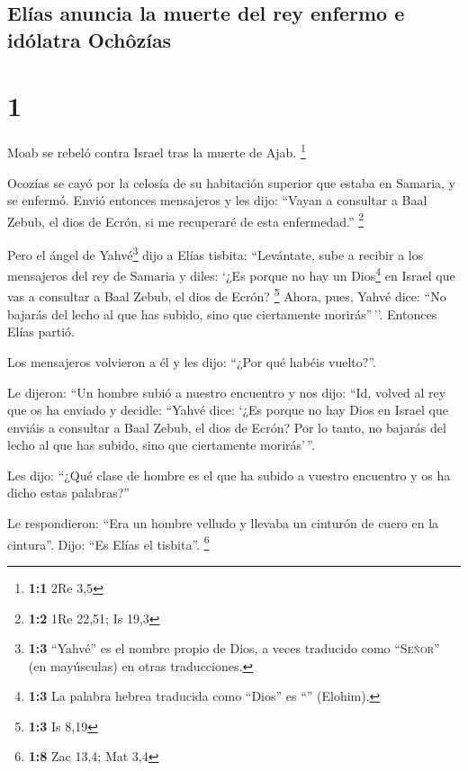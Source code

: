 \hypertarget{eluxedas-anuncia-la-muerte-del-rey-enfermo-e-iduxf3latra-ochuxf4zuxedas}{%
\subsection{Elías anuncia la muerte del rey enfermo e idólatra
Ochôzías}\label{eluxedas-anuncia-la-muerte-del-rey-enfermo-e-iduxf3latra-ochuxf4zuxedas}}

\hypertarget{section}{%
\section{1}\label{section}}

 Moab se rebeló contra Israel tras la muerte de Ajab.
\footnote{\textbf{1:1} 2Re 3,5}

 Ocozías se cayó por la celosía de su habitación superior
que estaba en Samaria, y se enfermó. Envió entonces mensajeros y les
dijo: ``Vayan a consultar a Baal Zebub, el dios de Ecrón, si me
recuperaré de esta enfermedad.'' \footnote{\textbf{1:2} 1Re 22,51; Is
  19,3}

 Pero el ángel de Yahvé\footnote{\textbf{1:3} ``Yahvé'' es
  el nombre propio de Dios, a veces traducido como ``\textsc{Señor}''
  (en mayúsculas) en otras traducciones.} dijo a Elías tisbita:
``Levántate, sube a recibir a los mensajeros del rey de Samaria y diles:
`¿Es porque no hay un Dios\footnote{\textbf{1:3} La palabra hebrea
  traducida como ``Dios'' es ``'' (Elohim).} en Israel que
vas a consultar a Baal Zebub, el dios de Ecrón? \footnote{\textbf{1:3}
  Is 8,19}  Ahora, pues, Yahvé dice: ``No bajarás del
lecho al que has subido, sino que ciertamente morirás''\,''. Entonces
Elías partió.

 Los mensajeros volvieron a él y les dijo: ``¿Por qué
habéis vuelto?''.

 Le dijeron: ``Un hombre subió a nuestro encuentro y nos
dijo: ``Id, volved al rey que os ha enviado y decidle: ``Yahvé dice:
`¿Es porque no hay Dios en Israel que enviáis a consultar a Baal Zebub,
el dios de Ecrón? Por lo tanto, no bajarás del lecho al que has subido,
sino que ciertamente morirás'\,''.

 Les dijo: ``¿Qué clase de hombre es el que ha subido a
vuestro encuentro y os ha dicho estas palabras?''

 Le respondieron: ``Era un hombre velludo y llevaba un
cinturón de cuero en la cintura''. Dijo: ``Es Elías el tisbita''.
\footnote{\textbf{1:8} Zac 13,4; Mat 3,4}

